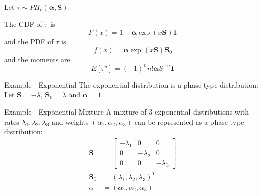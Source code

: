 \documentclass{beamer}
\theoremstyle{definition}
\begin{document}
\begin{frame}
Let $\tau \sim PH_c(\boldsymbol{\alpha}, \mathbf{S})$.

The CDF of $\tau$ is
$$ 
F(x) = 1 - \boldsymbol{\alpha} \exp(x \mathbf{S}) \mathbf{1}
$$
and the PDF of $\tau$ is
$$
f(x) = \boldsymbol{\alpha} \exp(x \mathbf{S}) \mathbf{S}_0
$$  
and the moments are
$$
E[\tau^{{n}}]=(-1)^{{n}}n!{\boldsymbol  {\alpha }}{S}^{{-n}}{\mathbf  {1}}
$$
\end{frame}

\begin{frame}{Example - Exponential}
The exponential distribution is a phase-type distribution:
Let $\mathbf S = - \lambda$, $\mathbf{S}_0 = \lambda$ and $\boldsymbol{\alpha} = 1$.
\end{frame}

\begin{frame}{Example - Exponential Mixture}
A mixture of 3 exponential distributions with rates $\lambda_1, \lambda_2, \lambda_3$ and weights $(\alpha_1, \alpha_2, \alpha_3)$ can be represented as a phase-type distribution:
\begin{align*}
    \mathbf S &= \begin{bmatrix}
        -\lambda_1 & 0 & 0\\
        0 & - \lambda_2 & 0\\
        0 & 0 & - \lambda_3
        \end{bmatrix}\\
    \mathbf{S}_0 &= (\lambda_1, \lambda_2, \lambda_3)^T\\
    \alpha &= (\alpha_1, \alpha_2, \alpha_3)
\end{align*}
\end{frame}

\end{document}
